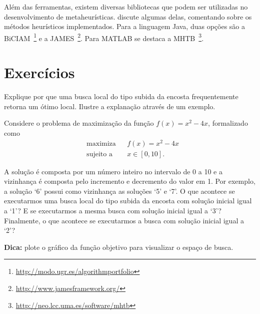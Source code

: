 Além das ferramentas, existem diversas bibliotecas que podem ser utilizadas no desenvolvimento de metaheurísticas. \cite{FinkEtAl2003} discute algumas delas, comentando sobre os métodos heurísticos implementados. Para a linguagem Java, duas opções são a BiCIAM~\footnote{\url{http://modo.ugr.es/algorithmportfolio}} e a JAMES~\footnote{\url{http://www.jamesframework.org/}}. Para MATLAB se destaca a MHTB~\footnote{\url{http://neo.lcc.uma.es/software/mhtb}}.

\section{Exercícios}
\resetexercisenumbering

\begin{exercise}
Explique por que uma busca local do tipo subida da encosta frequentemente retorna um ótimo local. Ilustre a explanação através de um exemplo.
\end{exercise}

\begin{exercise}
Considere o problema de maximização da função $f(x) = x^2 - 4x$, formalizado como
$$
\begin{aligned}
	& \text{maximiza} & & f(x) = x^2 - 4x \\
	& \text{sujeito a} & & x \in [0, 10].
\end{aligned}
$$

A solução é composta por um número inteiro no intervalo de 0 a 10 e a vizinhança é composta pelo incremento e decremento do valor em 1. Por exemplo, a solução `6' possui como vizinhança as soluções `5' e `7'. O que acontece se executarmos uma busca local do tipo subida da encosta com solução inicial igual a `1'? E se executarmos a mesma busca com solução inicial igual a `3'? Finalmente, o que acontece se executarmos a busca com solução inicial igual a `2'?

\textbf{Dica:} plote o gráfico da função objetivo para visualizar o espaço de busca.

\end{exercise}


